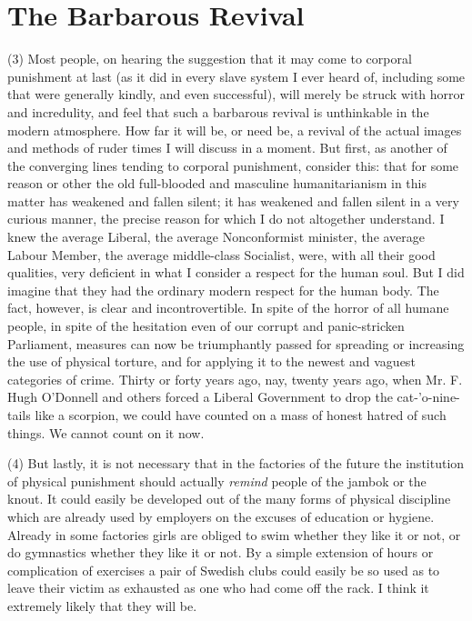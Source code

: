 \documentclass{book}
\begin{document}
\section{The Barbarous Revival}
(3) Most people, on hearing the suggestion that it may come to corporal punishment at last (as it did in every slave system I ever heard of, including some that were generally kindly, and even successful), will merely be struck with horror and incredulity, and feel that such a barbarous revival is unthinkable in the modern atmosphere. How far it will be, or need be, a revival of the actual images and methods of ruder times I will discuss in a moment. But first, as another of the converging lines tending to corporal punishment, consider this: that for some reason or other the old full-blooded and masculine humanitarianism in this matter has weakened and fallen silent; it has weakened and fallen silent in a very curious manner, the precise reason for which I do not altogether understand. I knew the average Liberal, the average Nonconformist minister, the average Labour Member, the average middle-class Socialist, were, with all their good qualities, very deficient in what I consider a respect for the human soul. But I did imagine that they had the ordinary modern respect for the human body. The fact, however, is clear and incontrovertible. In spite of the horror of all humane people, in spite of the hesitation even of our corrupt and panic-stricken Parliament, measures can now be triumphantly passed for spreading or increasing the use of physical torture, and for applying it to the newest and vaguest categories of crime. Thirty or forty years ago, nay, twenty years ago, when Mr. F. Hugh O’Donnell and others forced a Liberal Government to drop the cat-’o-nine-tails like a scorpion, we could have counted on a mass of honest hatred of such things. We cannot count on it now.

(4) But lastly, it is not necessary that in the factories of the future the institution of physical punishment should actually \emph{remind} people of the jambok or the knout. It could easily be developed out of the many forms of physical discipline which are already used by employers on the excuses of education or hygiene. Already in some factories girls are obliged to swim whether they like it or not, or do gymnastics whether they like it or not. By a simple extension of hours or complication of exercises a pair of Swedish clubs could easily be so used as to leave their victim as exhausted as one who had come off the rack. I think it extremely likely that they will be.
\end{document}
